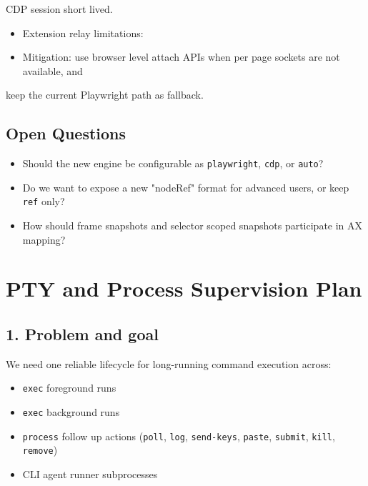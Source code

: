 CDP session short lived.
\begin{itemize}
  \item Extension relay limitations:
  \item Mitigation: use browser level attach APIs when per page sockets are not available, and
\end{itemize}

keep the current Playwright path as fallback.

\subsection{Open Questions}


\begin{itemize}
  \item Should the new engine be configurable as \texttt{playwright}, \texttt{cdp}, or \texttt{auto}?
  \item Do we want to expose a new "nodeRef" format for advanced users, or keep \texttt{ref} only?
  \item How should frame snapshots and selector scoped snapshots participate in AX mapping?
\end{itemize}



\clearpage

\section{PTY and Process Supervision Plan}


\subsection{1. Problem and goal}


We need one reliable lifecycle for long-running command execution across:

\begin{itemize}
  \item \texttt{exec} foreground runs
  \item \texttt{exec} background runs
  \item \texttt{process} follow up actions (\texttt{poll}, \texttt{log}, \texttt{send-keys}, \texttt{paste}, \texttt{submit}, \texttt{kill}, \texttt{remove})
  \item CLI agent runner subprocesses
\end{itemize}


